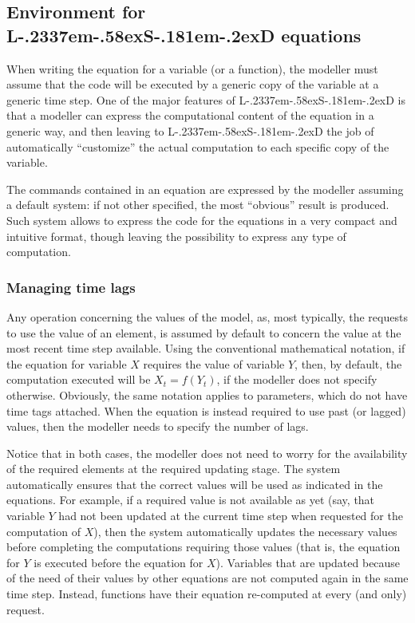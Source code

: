 \documentclass [11pt,a4paper] {book}
\def\LsD{{L\kern-.2337em\lower-.58ex\hbox{S}\kern-.181em\lower-.2ex\hbox{D}}\xspace}
\begin{document}
\subsection{Environment for \LsD equations}

When writing the equation for a variable (or a function), the modeller must assume that the code will be executed by a generic copy of the variable at a generic time step. One of the major features of \LsD is that a modeller can express the computational content of the equation in a generic way, and then leaving to \LsD the job of automatically ``customize'' the actual computation to each specific copy of the variable. 

The commands contained in an equation are expressed by the modeller assuming a default system: if not other specified, the most ``obvious'' result is produced. Such system allows to express the code for the equations in a very compact and intuitive format, though leaving the possibility to express any type of computation.

\subsubsection{Managing time lags}
Any operation concerning the values of the model, as, most typically, the requests to use the value of an element, is assumed by default to concern the value at the most recent time step available. Using the conventional mathematical notation, if the equation for variable $X$ requires the value of variable $Y$, then, by default, the computation executed will be $X_t=f(Y_t)$, if the modeller does not specify otherwise. Obviously, the same notation applies to parameters, which do not have time tags attached. When the equation is instead required to use past (or lagged) values, then the modeller needs to specify the number of lags.

Notice that in both cases, the modeller does not need to worry for the availability of the required elements at the required updating stage. The system automatically ensures that the correct values will be used as indicated in the equations. For example, if a required value is not available as yet (say, that variable $Y$ had not been updated at the current time step when requested for the computation of $X$), then the system automatically updates the necessary values before completing the computations requiring those values (that is, the equation for $Y$ is executed before the equation for $X$). Variables that are updated because of the need of their values by other equations are not computed again in the same time step. Instead, functions have their equation re-computed at every (and only) request.
\end{document}
